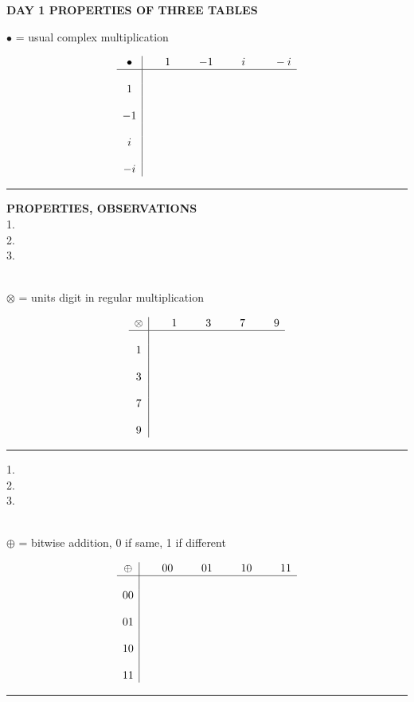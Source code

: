 \documentclass[12pt, fleqn, twoside]{book}
\begin{document}
{\large \bf DAY 1  PROPERTIES OF THREE TABLES}\\[.25in]
%
%
%
$\bullet $ = usual complex multiplication\\
\begin{minipage}{2.75in}
$$\begin{array}{c|cccc}
\bullet & \phantom{--}1\phantom{--} & -1& \phantom{--}i &\phantom{--} -i\\
\hline
\\
1&&&&\\
\\
-1&&&&\\
\\
i&&&&\\
\\
-i&&&&
\end{array}$$
\end{minipage}\rule{.75in}{0in}
\begin{minipage}{3in}
{\bf PROPERTIES, OBSERVATIONS}\\
1.\\[.3in]
2.\\[.3in]
3.\\
\end{minipage}\\[.75in]
%
%
%
$\otimes $ = units digit in regular multiplication\\
\begin{minipage}{2.6in}
$$\begin{array}{c|cccc}
\otimes & \phantom{--}1\phantom{--} & 3 & \phantom{--}7 &\phantom{--} 9\\
\hline
\\
1&&&&\\
\\
3&&&&\\
\\
7&&&&\\
\\
9&&&&
\end{array}$$
\end{minipage}\rule{.85in}{0in}
\begin{minipage}{3in}
1.\\[.3in]
2.\\[.3in]
3.\\
\end{minipage}\\[.75in]
%
%
%
$\oplus $ = bitwise addition, 0 if same, 1 if different\\
\begin{minipage}{2.75in}
$$\begin{array}{c|cccc}
\oplus & \phantom{--}00\phantom{--} & 01 & \phantom{--}10 &\phantom{--} 11\\
\hline
\\
00&&&&\\
\\
01&&&&\\
\\
10&&&&\\
\\
11&&&&
\end{array}$$
\end{minipage}\rule{.75in}{0in}
\end{document}

